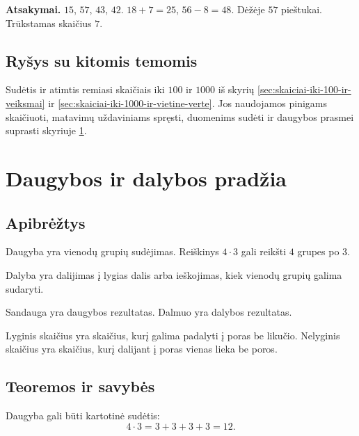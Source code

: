 \textbf{Atsakymai.} \(15\), \(57\), \(43\), \(42\). \(18+7=25\), \(56-8=48\). Dėžėje \(57\) pieštukai. Trūkstamas skaičius \(7\).

\subsection{Ryšys su kitomis temomis}

Sudėtis ir atimtis remiasi skaičiais iki \(100\) ir \(1000\) iš skyrių \ref{sec:skaiciai-iki-100-ir-veiksmai} ir \ref{sec:skaiciai-iki-1000-ir-vietine-verte}. Jos naudojamos pinigams skaičiuoti, matavimų uždaviniams spręsti, duomenims sudėti ir daugybos prasmei suprasti skyriuje \ref{sec:daugybos-ir-dalybos-pradzia}.

\section{Daugybos ir dalybos pradžia}\label{sec:daugybos-ir-dalybos-pradzia}

\subsection{Apibrėžtys}

\begin{apibreztis}
Daugyba yra vienodų grupių sudėjimas. Reiškinys \(4\cdot 3\) gali reikšti \(4\) grupes po \(3\).
\end{apibreztis}

\begin{apibreztis}
Dalyba yra dalijimas į lygias dalis arba ieškojimas, kiek vienodų grupių galima sudaryti.
\end{apibreztis}

\begin{apibreztis}
Sandauga yra daugybos rezultatas. Dalmuo yra dalybos rezultatas.
\end{apibreztis}

\begin{apibreztis}
Lyginis skaičius yra skaičius, kurį galima padalyti į poras be likučio. Nelyginis skaičius yra skaičius, kurį dalijant į poras vienas lieka be poros.
\end{apibreztis}

\subsection{Teoremos ir savybės}

\begin{savybe}
Daugyba gali būti kartotinė sudėtis:
\[
4\cdot 3=3+3+3+3=12.
\]
\end{savybe}

